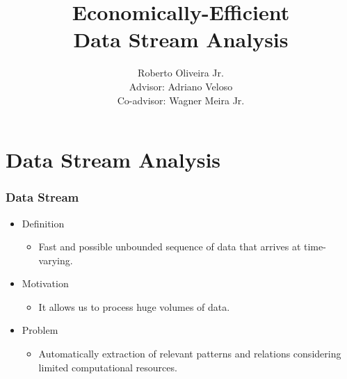 \documentclass[14pt]{beamer}
\title{Economically-Efficient\\Data Stream Analysis}
\author{\small{Roberto Oliveira Jr.\\Advisor: Adriano Veloso \\Co-advisor: Wagner Meira Jr.}}
\institute{Computer Science Dept - UFMG - Brazil}
\date{}
\begin{document}
\begin{frame}
\titlepage
\end{frame}

\section{Data Stream Analysis}

\begin{frame}\frametitle{Data Stream}

\begin{itemize}
\item Definition
\begin{itemize}
\item Fast and possible unbounded sequence of data that arrives at time-varying.
\end{itemize}
\item Motivation
\begin{itemize}
\item It allows us to process huge volumes of data.
\end{itemize}
\end{itemize}
\begin{itemize}
\item Problem
\begin{itemize}
\item Automatically extraction of relevant patterns and relations considering limited computational resources.
\end{itemize}
\end{itemize}

\end{frame}




\end{document}

